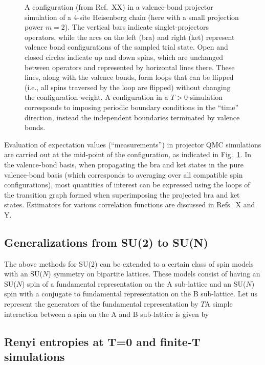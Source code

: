 \documentclass[range]{ar2e}
\begin{document}
\begin{figure}
\centerline{}
\caption{A configuration (from Ref.~XX) in a valence-bond projector simulation of a 4-site Heisenberg chain (here with a small
projection power $m=2$). The vertical bars indicate singlet-projectors operators, while the arcs on the left (bra) and right (ket) 
represent valence bond configurations of the sampled trial state. Open and closed circles indicate up and down spins, which are unchanged 
between operators and represented by horizontal lines there. These lines, along with the valence bonds, form loops that can be flipped
(i.e., all spins traversed by the loop are flipped) without changing the configuration weight. A configuration in a $T>0$ simulation 
corresponds to imposing periodic boundary conditions in the ``time'' direction, instead the independent boundaries
terminated by valence bonds.}
\label{loops}
\end{figure}

Evaluation of expectation values (``measurements'') in projector QMC simulations are carried out at the mid-point of the configuration,
as indicated in Fig.~\ref{loops}. In the valence-bond basis, when propagating the bra and ket states in the pure valence-bond basis (which 
corresponds to averaging over all compatible spin configurations), most quantities of interest can be expressed using the loops of the
transition graph formed when superimposing the projected bra and ket states. Estimators for various correlation functions are discussed
in Refs.~X and Y.

\subsection {Generalizations from SU(2) to SU(N)}
\label{ss:su2N}

The above methods for SU(2) can be extended to a certain
class of spin models with an SU($N$) symmetry on bipartite
lattices. These models consist of having an SU($N$) spin of a
fundamental representation on the A sub-lattice and an SU($N$) spin with
a conjugate to fundamental representation on the B sub-lattice. Let us
represent the generators of the fundamental representation by $T$A
simple interaction between a spin on the A and B sub-lattice is given
by 



\subsection{Renyi entropies at T=0 and finite-T simulations} \label{ss:renyi}
\end{document}
